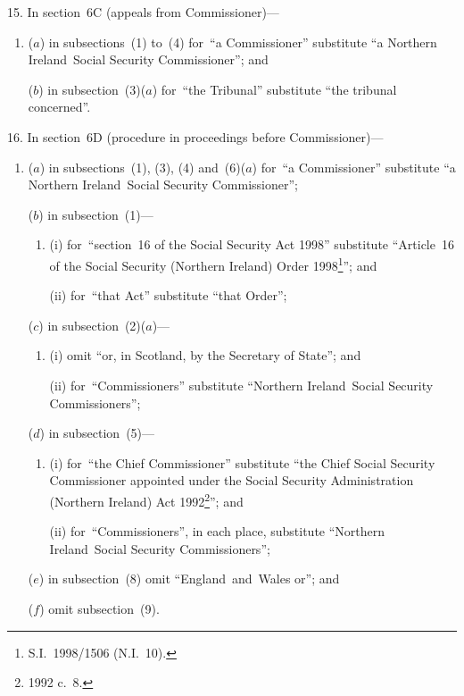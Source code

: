 \documentclass[12pt,a4paper]{article}
\begin{document}
\medskip

15.  In section~6C (appeals from Commissioner)—
\begin{enumerate}\item[]
($a$) in subsections~(1) to~(4) for~“a Commissioner” substitute “a Northern Ireland~Social Security Commissioner”; and

($b$) in subsection~(3)($a$)  for~“the Tribunal” substitute “the tribunal concerned”.
\end{enumerate}

\medskip

16.  In section~6D (procedure in proceedings before Commissioner)—
\begin{enumerate}\item[]
($a$) in subsections~(1), (3), (4) and~(6)($a$)  for~“a Commissioner” substitute “a Northern Ireland~Social Security Commissioner”;

($b$) in subsection~(1)—
\begin{enumerate}\item[]
(i) for~“section~16 of the Social Security Act 1998” substitute “Article~16 of the Social Security (Northern Ireland) Order 1998\footnote{S.I.~1998/1506 (N.I.~10).}”; and

(ii) for~“that Act” substitute “that Order”;
\end{enumerate}

($c$) in subsection~(2)($a$)—
\begin{enumerate}\item[]
(i) omit “or, in Scotland, by the Secretary of State”; and

(ii) for~“Commissioners” substitute “Northern Ireland~Social Security Commissioners”;
\end{enumerate}

($d$) in subsection~(5)—
\begin{enumerate}\item[]
(i) for~“the Chief Commissioner” substitute “the Chief Social Security Commissioner appointed under the Social Security Administration (Northern Ireland) Act 1992\footnote{1992 c.~8.}”; and

(ii) for~“Commissioners”, in each place, substitute “Northern Ireland~Social Security Commissioners”;
\end{enumerate}

($e$) in subsection~(8) omit “England~and~Wales or”; and

($f$) omit subsection~(9).
\end{enumerate}
\end{document}
